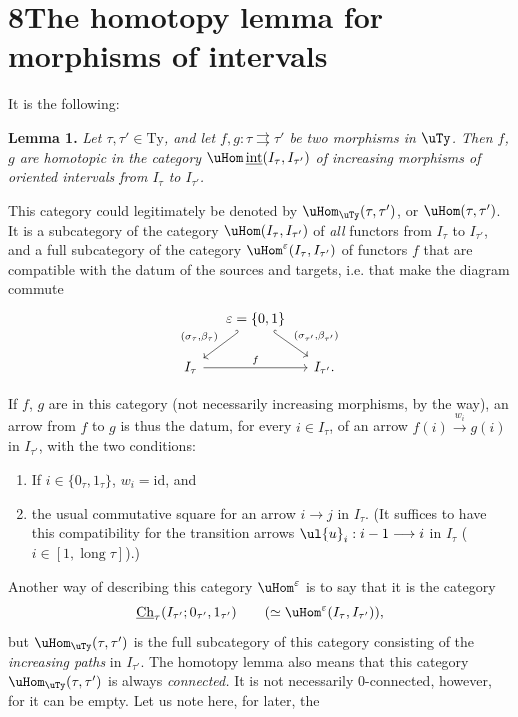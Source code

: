 

\section*{8\quad The homotopy lemma for morphisms of intervals}

It is the following:

\textbf{Lemma 1.} \textit{Let $\tau,\tau'\in\mathrm{Ty}$, and let $f,g:\tau\rightrightarrows\tau'$ be two morphisms in $\uTy$. Then $f$, $g$ are homotopic in the category $\uHom\,\underline{\mathrm{int}}(I_\tau,I_{\tau'})$ of increasing morphisms of oriented intervals from $I_\tau$ to $I_{\tau'}$.}

This category could legitimately be denoted by $\uHom_{\uTy}(\tau,\tau')$, or $\uHom(\tau,\tau')$. It is a subcategory of the category $\uHom(I_\tau,I_{\tau'})$ of \textit{all} functors from $I_\tau$ to $I_{\tau'}$, and a full subcategory of the category $\uHom^\varepsilon(I_\tau,I_{\tau'})$ of functors $f$ that are compatible with the datum of the sources and targets, i.e. that make the diagram commute
\[
\begin{tikzcd}[column sep=small]
 & \varepsilon=\{0,1\} \arrow[dl, hook', "{(\sigma_\tau,\beta_\tau)}"'] \arrow[dr, hook, "{(\sigma_{\tau'},\beta_{\tau'})}"] & \\
I_\tau \arrow[rr, "f"] & & I_{\tau'}.
\end{tikzcd}
\]

If $f$, $g$ are in this category (not necessarily increasing morphisms, by the way), an arrow from $f$ to $g$ is thus the datum, for every $i\in I_\tau$, of an arrow $f(i)\xrightarrow{w_i}g(i)$ in $I_{\tau'}$, with the two conditions:

\begin{enumerate}[label={}, leftmargin=*]
\item[a)] If $i\in\{0_\tau,1_\tau\}$, $w_i=\mathrm{id}$, and
\item[b)] the usual commutative square for an arrow $i\longrightarrow j$ in $I_\tau$. (It suffices to have this compatibility for the transition arrows $\ul{u}_i:i-1\longrightarrow i$ in $I_\tau$ ($i\in[1,\operatorname{long}\tau]$).)
\end{enumerate}

Another way of describing this category $\uHom^\varepsilon$ is to say that it is the category
\[
\underline{\mathrm{Ch}}_\tau(I_{\tau'};0_{\tau'},1_{\tau'})\qquad(\simeq\uHom^\varepsilon(I_\tau,I_{\tau'})),
\]
but $\uHom_{\uTy}(\tau,\tau')$ is the full subcategory of this category consisting of the \textit{increasing paths} in $I_{\tau'}$. The homotopy lemma also means that this category $\uHom_{\uTy}(\tau,\tau')$ is always \textit{connected.} It is not necessarily 0-connected, however, for it can be empty. Let us note here, for later, the

